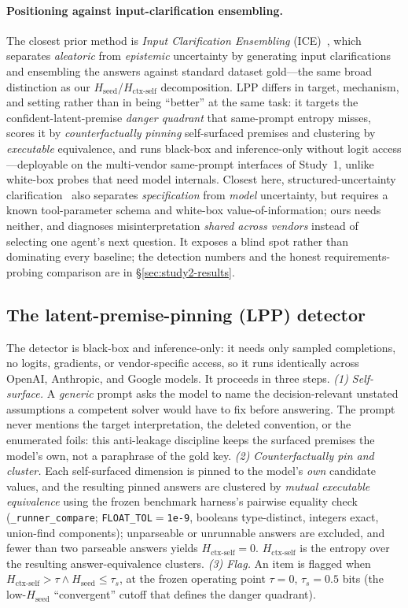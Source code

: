 \documentclass[acmsmall,screen,review,anonymous]{acmart}
\newcommand{\Hseed}{\ensuremath{H_{\mathrm{seed}}}}
\newcommand{\Hctx}{\ensuremath{H_{\text{ctx-self}}}}
\begin{document}
\paragraph{Positioning against input-clarification ensembling.} The closest prior method is
\emph{Input Clarification Ensembling} (ICE)~\cite{hou2024decomposing}, which separates \emph{aleatoric} from
\emph{epistemic} uncertainty by generating input clarifications and ensembling the answers against standard
dataset gold---the same broad distinction as our \Hseed{}/\Hctx{} decomposition. LPP differs in target,
mechanism, and setting rather than in being ``better'' at the same task: it targets the
confident-latent-premise \emph{danger quadrant} that same-prompt entropy misses, scores it by
\emph{counterfactually pinning} self-surfaced premises and clustering by \emph{executable} equivalence, and
runs black-box and inference-only without logit access---deployable on the multi-vendor same-prompt
interfaces of Study~1, unlike white-box probes that need model internals. Closest here,
structured-uncertainty clarification~\cite{suri2025structured} also separates \emph{specification} from
\emph{model} uncertainty, but requires a known tool-parameter schema and white-box value-of-information; ours
needs neither, and diagnoses misinterpretation \emph{shared across vendors} instead of selecting one agent's
next question. It exposes a blind spot rather than
dominating every baseline; the detection numbers and the honest requirements-probing comparison are in
\S\ref{sec:study2-results}.

\subsection{The latent-premise-pinning (LPP) detector}
\label{sec:study2-method}
The detector is black-box and inference-only: it needs only sampled completions, no logits, gradients, or
vendor-specific access, so it runs identically across OpenAI, Anthropic, and Google models. It proceeds in
three steps. \emph{(1) Self-surface.} A \emph{generic} prompt asks the model to name the decision-relevant
unstated assumptions a competent solver would have to fix before answering. The prompt never mentions the
target interpretation, the deleted convention, or the enumerated foils: this anti-leakage discipline keeps
the surfaced premises the model's own, not a paraphrase of the gold key. \emph{(2) Counterfactually pin and
cluster.} Each self-surfaced dimension is pinned to the model's \emph{own} candidate values, and the
resulting pinned answers are clustered by \emph{mutual executable equivalence} using the frozen benchmark
harness's pairwise equality check (\texttt{\_runner\_compare}; \texttt{FLOAT\_TOL}$=$\texttt{1e-9},
booleans type-distinct, integers exact, union-find components); unparseable or unrunnable answers are
excluded, and fewer than two parseable answers yields \Hctx{}$=0$. \Hctx{} is the entropy over the resulting
answer-equivalence clusters. \emph{(3) Flag.} An item is flagged when
$\Hctx{} > \tau \wedge \Hseed{} \le \tau_s$, at the frozen operating point $\tau=0$, $\tau_s=0.5$ bits
(the low-\Hseed{} ``convergent'' cutoff that defines the danger quadrant).
\end{document}
